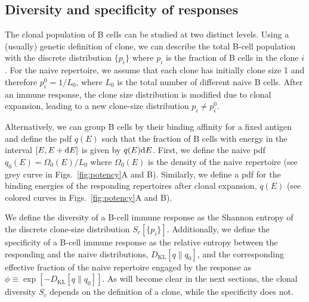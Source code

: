 \documentclass[aps, pre, twocolumn, 10pt, groupedaddress, superscriptaddress, linenumbers]{revtex4-2}
\newcommand{\on}{\text{on}}
\newcommand{\DG}{E}
\renewcommand{\d}{{\rm d}}
\newcommand{\DKL}{D_{\mathrm{KL}}}
\begin{document}
\subsection*{Diversity and specificity of responses}
The clonal population of B cells can be studied at two distinct levels.
Using a (usually) genetic definition of clone, we can describe the total B-cell population with the discrete distribution $\{p_i\}$ where $p_i$ is the fraction of B cells in the clone $i$.
For the naive repertoire, we assume that each clone has initially clone size 1 and therefore $p_i^0 = 1/L_0$, where $L_0$ is the total number of different naive B cells.
After an immune response, the clone size distribution is modified due to clonal expansion, leading to a new clone-size distribution $p_i\neq p_i^0$.

Alternatively, we can group B cells by their binding affinity for a fixed antigen and define the pdf $q(\DG)$ such that the fraction of B cells with energy in the interval $[\DG, \DG + \d\DG]$ is given by $q(\DG)\d\DG$.
First, we define the naive pdf $q_0(\DG) = \Omega_0(\DG)/L_0$ where $\Omega_0(\DG)$ is the density of the naive repertoire (see grey curve in Figs.~\ref{fig:potency}A and B).
Similarly, we define a pdf for the binding energies of the responding repertoires after clonal expansion, $q(\DG)$ (see colored curves in Figs.~\ref{fig:potency}A and B).


We define the diversity of a B-cell immune response as the Shannon entropy of the discrete clone-size distribution $S_c[\{p_i\}]$.
Additionally, we define the specificity of a B-cell immune response as the relative entropy between the responding and the naive distributions, $\DKL[q\|q_0]$, and the corresponding effective fraction of the naive repertoire engaged by the response as $\phi \equiv \exp\left[-\DKL[q\|q_0]\right]$.
As will become clear in the next sections, the clonal diversity $S_c$ depends on the definition of a clone, while the specificity does not.
\end{document}
